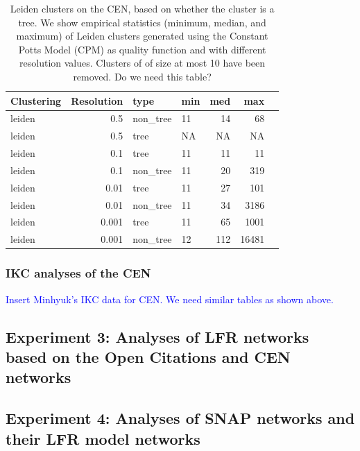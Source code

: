 \documentclass[11pt]{article}   	%
\begin{document}
\begin{table}[H]
\centering
\begin{tabular}{lrllrrr}
  \hline
 Clustering & Resolution & type & min & med & max \\
  \hline
leiden & 0.5 & non\_tree &  11 & 14 &  68 \\
leiden & 0.5 & tree &  NA & NA &  NA \\
leiden & 0.1 & tree &  11 & 11 &  11 \\
leiden  & 0.1 & non\_tree &  11 & 20 & 319 \\
leiden  & 0.01 & tree &  11 & 27 & 101 \\
leiden & 0.01 & non\_tree &  11 & 34 & 3186 \\
leiden & 0.001 & tree &  11 & 65 & 1001 \\
leiden & 0.001 & non\_tree &  12 & 112 & 16481 \\

   \hline
\end{tabular}
\caption{Leiden clusters on the CEN, based on whether the cluster is a tree. We show empirical statistics (minimum, median, and maximum) of Leiden clusters generated using the Constant Potts Model (CPM) as quality function and with different resolution values. Clusters of of size at most 10 have been removed. Do we need this table?}
\end{table}



\subsubsection{IKC analyses of the CEN}

\textcolor{blue}{Insert Minhyuk's IKC data for CEN. We need similar tables as shown above. }


\subsection{Experiment 3: Analyses of LFR networks based on the Open Citations and CEN networks}

\subsection{Experiment 4: Analyses of SNAP networks and their LFR model networks}
\end{document}
